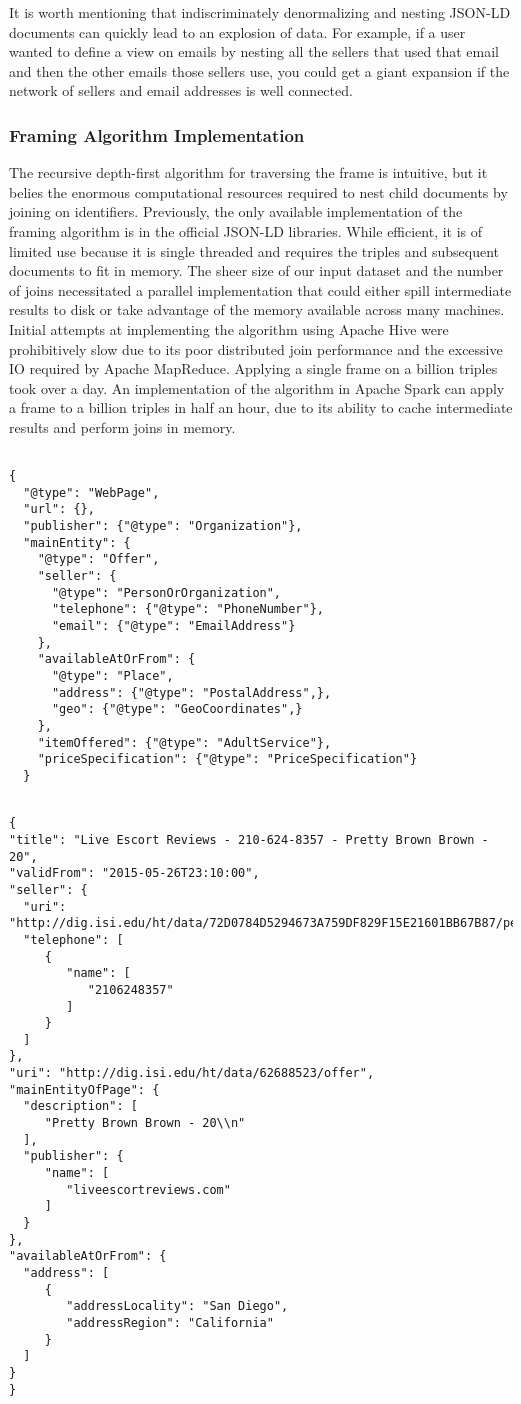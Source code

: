 It is worth mentioning that indiscriminately denormalizing and nesting JSON-LD documents can quickly lead to an explosion of data.  For example, if a user wanted to define a view on emails by nesting all the sellers that used that email and then the other emails those sellers use, you could get a giant expansion if the network of sellers and email addresses is well connected.    

\subsubsection{Framing Algorithm Implementation}
The recursive depth-first algorithm for traversing the frame is intuitive, but it belies the enormous computational resources required to nest child documents by joining on identifiers.
Previously, the only available implementation of the framing algorithm is in the official JSON-LD libraries.  %
While efficient, it is of limited use because it  is single threaded and requires the triples and subsequent documents to fit in memory.
The sheer size of our input dataset and the number of joins necessitated a parallel implementation that could either spill intermediate results to disk or take advantage of the memory available across many machines. 
Initial attempts at implementing the algorithm using Apache Hive were prohibitively slow due to its poor distributed join performance and the excessive IO required by Apache MapReduce.  Applying a single frame on a billion triples took over a day.  
An implementation of the algorithm in Apache Spark can apply a frame to a billion triples in half an hour, due to its ability to cache intermediate results and perform joins in memory.   

\begin{verbatim}

{
  "@type": "WebPage",
  "url": {},
  "publisher": {"@type": "Organization"},
  "mainEntity": {
    "@type": "Offer",
    "seller": {
      "@type": "PersonOrOrganization",
      "telephone": {"@type": "PhoneNumber"},
      "email": {"@type": "EmailAddress"}
    },
    "availableAtOrFrom": {
      "@type": "Place",
      "address": {"@type": "PostalAddress",},
      "geo": {"@type": "GeoCoordinates",}
    },
    "itemOffered": {"@type": "AdultService"},
    "priceSpecification": {"@type": "PriceSpecification"}
  }


\end{verbatim}

\begin{verbatim}
{
"title": "Live Escort Reviews - 210-624-8357 - Pretty Brown Brown - 20",
"validFrom": "2015-05-26T23:10:00",
"seller": {
  "uri": "http://dig.isi.edu/ht/data/72D0784D5294673A759DF829F15E21601BB67B87/personororganization",
  "telephone": [
     {
        "name": [
           "2106248357"
        ]
     }
  ]
},
"uri": "http://dig.isi.edu/ht/data/62688523/offer",
"mainEntityOfPage": {
  "description": [
     "Pretty Brown Brown - 20\\n"
  ],
  "publisher": {
     "name": [
        "liveescortreviews.com"
     ]
  }
},
"availableAtOrFrom": {
  "address": [
     {
        "addressLocality": "San Diego",
        "addressRegion": "California"
     }
  ]
}
}
\end{verbatim}

